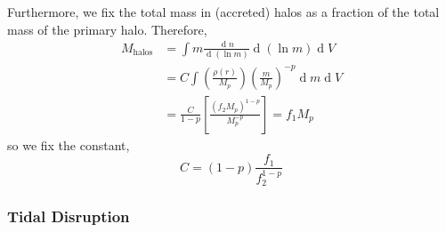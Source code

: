 \documentclass[usenatbib]{mnras}
\renewcommand{\d}[1]{\! \mathrm{d}#1 \:}
\newcommand{\deriv}[2]{\frac{\d{#1}}{\d{#2}}}
\renewcommand{\d}[1]{\ensuremath{\operatorname{d}\!{#1}}}
\begin{document}
	Furthermore, we fix the total mass in (accreted) halos as a fraction of the total mass of the primary halo. Therefore,
\begin{align}
M_{\mathrm{halos}} & = \int m \deriv{n}{(\ln{m})} \d{(\ln{m})} \d{V}
\\
& = C \int \left(\frac{\rho(r)}{M_p}\right) \left(\frac{m}{M_p} \right)^{-p} \d{m} \d{V} 
\\
& = \frac{C}{1-p} \left[ \frac{(f_2 M_p)^{1-p}}{M_p^{-p}} \right] = f_1 M_p 
\end{align} 
so we fix the constant,
\begin{equation}
C = (1 - p)\frac{f_1}{f_2^{1-p}} 
\end{equation}

\subsubsection{Tidal Disruption} 
\end{document}
